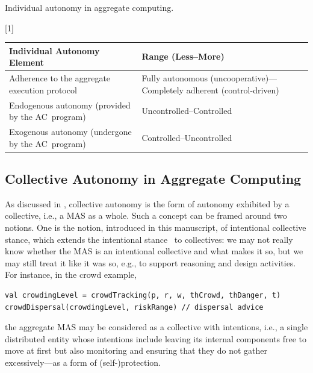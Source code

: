 \documentclass[jsan,article,accept,moreauthors,pdftex]{Definitions/mdpi}
\begin{document}
\begin{paracol}{2}
 \begin{specialtable}[H]
   \tablesize{\fontsize{8}{8}\selectfont}
  \caption{Individual autonomy in aggregate computing.}
\label{table:summary-ac-individual-autonomy}
\setlength{\cellWidtha}{\columnwidth/2-2\tabcolsep+0.2in}
\setlength{\cellWidthb}{\columnwidth/2-2\tabcolsep-0.2in}

\scalebox{1}[1]{\begin{tabularx}{\columnwidth}{>{\PreserveBackslash\raggedright}m{\cellWidtha}>{\PreserveBackslash\raggedright}m{\cellWidthb}}
\toprule
\textbf{Individual Autonomy Element} & \textbf{Range (Less--More)}
\\\midrule
Adherence to the aggregate execution protocol & Fully autonomous (uncooperative)---Completely adherent (control-driven)
\\\midrule
Endogenous autonomy (provided by the AC~program) & Uncontrolled--Controlled
\\\midrule
Exogenous autonomy (undergone by the AC~program) & Controlled--Uncontrolled\\
\bottomrule
\end{tabularx}}

\end{specialtable}


\subsection{Collective Autonomy in Aggregate Computing}
\label{contrib-collective-autonomy}

As discussed in , collective autonomy is the form of autonomy exhibited by a collective,
 i.e., a MAS as a whole.
%
Such a concept can be framed around two notions.
%
One is the notion, introduced in this manuscript, of {intentional collective stance},
 which extends the intentional stance~\cite{dennett1989intentional} to collectives:
 we may not really know whether the MAS {is} an intentional collective
 and {what} makes it so,
  but we may still {treat it like it was so}, e.g., to support reasoning and design activities.
%
For instance, in the crowd example,
%
\begin{lstlisting}
val crowdingLevel = crowdTracking(p, r, w, thCrowd, thDanger, t)
crowdDispersal(crowdingLevel, riskRange) // dispersal advice
\end{lstlisting}
%
the aggregate MAS may be considered as a collective
 with intentions, i.e., 
 a single distributed entity
 whose intentions include leaving its internal components free
 to move at first
 but also 
 monitoring and ensuring that they do not gather excessively---as a form of (self-)protection.


\end{paracol}
\end{document}
